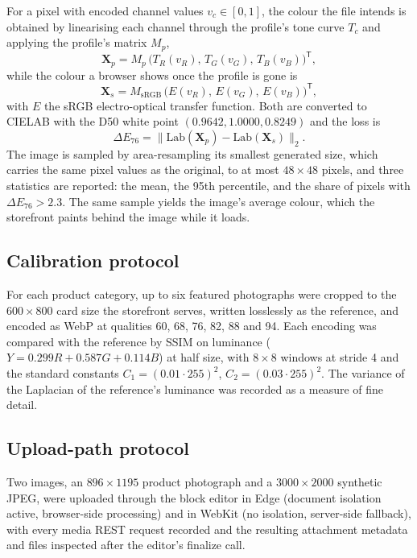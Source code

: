 \documentclass[sigconf,nonacm,screen]{acmart}
\begin{document}
For a pixel with encoded channel values $v_c \in [0,1]$, the colour the file intends is obtained by linearising each channel through the profile's tone curve $T_c$ and applying the profile's matrix $M_p$,
\begin{equation}
\mathbf{X}_p = M_p\,\big(T_R(v_R),\,T_G(v_G),\,T_B(v_B)\big)^{\mathsf T},
\end{equation}
while the colour a browser shows once the profile is gone is
\begin{equation}
\mathbf{X}_s = M_{\mathrm{sRGB}}\,\big(E(v_R),\,E(v_G),\,E(v_B)\big)^{\mathsf T},
\end{equation}
with $E$ the sRGB electro-optical transfer function. Both are converted to CIELAB with the D50 white point $(0.9642, 1.0000, 0.8249)$ and the loss is
\begin{equation}
\Delta E_{76} = \lVert \mathrm{Lab}(\mathbf{X}_p) - \mathrm{Lab}(\mathbf{X}_s) \rVert_2 .
\end{equation}
The image is sampled by area-resampling its smallest generated size, which carries the same pixel values as the original, to at most $48\times48$ pixels, and three statistics are reported: the mean, the 95th percentile, and the share of pixels with $\Delta E_{76} > 2.3$. The same sample yields the image's average colour, which the storefront paints behind the image while it loads.

\subsection{Calibration protocol}
\label{sec:calibmethod}

For each product category, up to six featured photographs were cropped to the $600\times800$ card size the storefront serves, written losslessly as the reference, and encoded as WebP at qualities 60, 68, 76, 82, 88 and 94. Each encoding was compared with the reference by SSIM on luminance ($Y = 0.299R + 0.587G + 0.114B$) at half size, with $8\times8$ windows at stride 4 and the standard constants $C_1=(0.01\cdot255)^2$, $C_2=(0.03\cdot255)^2$. The variance of the Laplacian of the reference's luminance was recorded as a measure of fine detail.

\subsection{Upload-path protocol}

Two images, an $896\times1195$ product photograph and a $3000\times2000$ synthetic JPEG, were uploaded through the block editor in Edge (document isolation active, browser-side processing) and in WebKit (no isolation, server-side fallback), with every media REST request recorded and the resulting attachment metadata and files inspected after the editor's finalize call.
\end{document}
